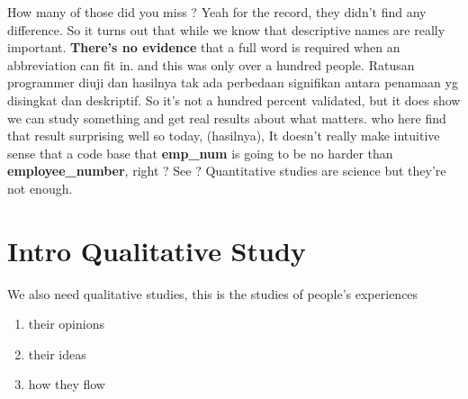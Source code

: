 \documentclass[14pt]{extreport}
\begin{document}
How many of those did you miss ?
Yeah for the record, they didn't find any difference.
So it turns out that while we know that descriptive names are really important.
\textbf{There's no evidence} that a full word is required when an abbreviation can fit in. 
and this was only over a hundred people. 
Ratusan programmer diuji dan hasilnya tak ada perbedaan signifikan antara penamaan yg disingkat dan deskriptif.
So it's not a hundred percent validated, but it does show we can study something and get real results about what matters. 
who here find that result surprising well so today, (hasilnya), It doesn’t really make intuitive sense that a code base that \textbf{emp\_num} is going to be no harder than \textbf{employee\_number}, right ? See ? Quantitative studies are science but they’re not enough.
\section{Intro Qualitative Study} %
We also need qualitative studies, this is the studies of people’s experiences
\begin{enumerate}
\item their opinions
\item their ideas
\item how they flow
\end{enumerate}
\end{document}
